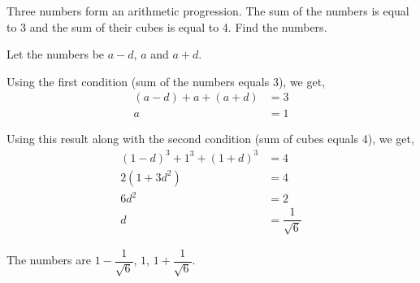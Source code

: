 
%
%
%
%
% 
% 

\question[4] Three numbers form an arithmetic progression. The sum of the numbers is equal to 3 and the sum of their cubes is equal to 4. Find the numbers.


\ifprintanswers
\fi 

\begin{solution}[\fullpage]
  Let the numbers be $a-d$, $a$ and $a+d$.
  
  Using the first condition (sum of the numbers equals 3), we get,
  \begin{align}
    (a-d) + a + (a+d) &= 3 \\
                             a &= 1
  \end{align}
  
  Using this result along with the second condition (sum of cubes equals 4), we get,
  \begin{align}
    (1-d)^3 + 1^3 + (1+d)^3 &= 4 \\
                         2(1 + 3d^2) &= 4 \\
                                    6d^2 &= 2 \\
                                          d &= \dfrac{1}{\sqrt{6}}
  \end{align}
  
  The numbers are $1-\dfrac{1}{\sqrt{6}}$, $1$, $1+\dfrac{1}{\sqrt{6}}$.
\end{solution}
